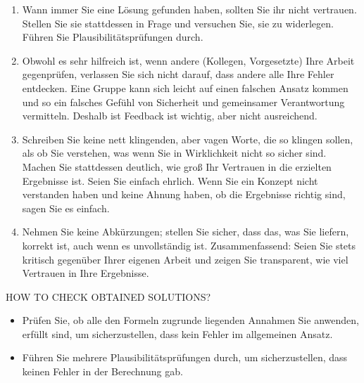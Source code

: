 \begin{enumerate}
    \item Wann immer Sie eine Lösung gefunden haben, sollten Sie ihr nicht vertrauen. Stellen Sie sie stattdessen in Frage und versuchen Sie, sie zu widerlegen. Führen Sie Plausibilitätsprüfungen durch. 
\item Obwohl es sehr hilfreich ist, wenn andere (Kollegen, Vorgesetzte) Ihre Arbeit gegenprüfen, verlassen Sie sich nicht darauf, dass andere alle Ihre Fehler entdecken. Eine Gruppe kann sich leicht auf einen falschen Ansatz kommen und so ein falsches Gefühl von Sicherheit und gemeinsamer Verantwortung vermitteln. Deshalb ist
Feedback ist wichtig, aber nicht ausreichend.
\item Schreiben Sie keine nett klingenden, aber vagen Worte, die so klingen sollen, als ob Sie verstehen, was wenn Sie in Wirklichkeit nicht so sicher sind. Machen Sie stattdessen deutlich, wie groß Ihr Vertrauen in die erzielten Ergebnisse ist. Seien Sie einfach ehrlich. Wenn Sie ein Konzept nicht verstanden haben und keine Ahnung haben, ob die Ergebnisse richtig sind, sagen Sie es einfach. 
\item  Nehmen Sie keine Abkürzungen; stellen Sie sicher, dass das, was Sie liefern, korrekt ist, auch wenn es unvollständig ist.  Zusammenfassend: Seien Sie stets kritisch gegenüber Ihrer eigenen Arbeit und zeigen Sie transparent, wie viel 
Vertrauen in Ihre Ergebnisse.
\end{enumerate}


HOW TO CHECK OBTAINED SOLUTIONS?
\begin{itemize}
    \item Prüfen Sie, ob alle den Formeln zugrunde liegenden Annahmen 
Sie anwenden, erfüllt sind, um sicherzustellen, dass kein 
Fehler im allgemeinen Ansatz.
\item Führen Sie mehrere Plausibilitätsprüfungen durch, um sicherzustellen, dass 
keinen Fehler in der Berechnung gab.
\end{itemize}


